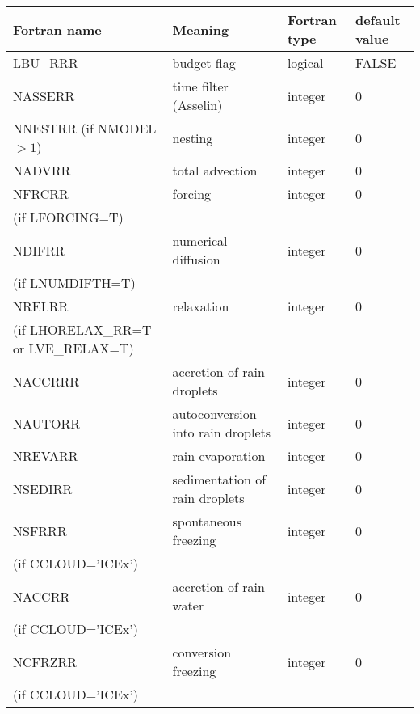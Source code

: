\begin{center}
\begin{tabular} {|p{8cm}|p{4cm}|>{\centering}p{1.5cm}|p{1.5cm}<{\centering}|}
\hline
Fortran name & Meaning & Fortran type & default value \\
\hline \hline
LBU\_RRR & budget flag & logical & FALSE\index{LBU\_RRR!\innam{NAM\_BU\_RRR}} \\\hline
NASSERR  & time filter (Asselin)   & integer  &  0 \index{NASSERR!\innam{NAM\_BU\_RRR}} \\\hline
NNESTRR (if NMODEL$>1$) & nesting           & integer  &  0 \index{NNESTRR!\innam{NAM\_BU\_RRR}} \\\hline
NADVRR   & total advection   & integer  &  0 \index{NADVRR!\innam{NAM\_BU\_RRR}}\\\hline
NFRCRR   & forcing           & integer  &  0 \index{NFRCRR!\innam{NAM\_BU\_RRR}} \\
(if LFORCING=T) &  &   &   \\\hline
NDIFRR   & numerical diffusion & integer  &  0 \index{NDIFRR!\innam{NAM\_BU\_RRR}}\\
(if LNUMDIFTH=T) &  &   &   \\\hline
NRELRR   & relaxation        & integer  &  0 \index{NRELRR!\innam{NAM\_BU\_RRR}}\\
(if LHORELAX\_RR=T or LVE\_RELAX=T) &  &   &   \\\hline
NACCRRR  & accretion of rain droplets & integer  &  0 \index{NACCRRR!\innam{NAM\_BU\_RRR}}\\\hline
NAUTORR   & autoconversion into rain droplets& integer  &  0 \index{NAUTORR!\innam{NAM\_BU\_RRR}}\\\hline
NREVARR   & rain evaporation  & integer  &  0 \index{NREVARR!\innam{NAM\_BU\_RRR}}\\\hline
NSEDIRR   & sedimentation of rain droplets& integer  &  0 \index{NSEDIRR!\innam{NAM\_BU\_RRR}}\\\hline
NSFRRR   & spontaneous freezing & integer  &  0 \index{NSFRRR!\innam{NAM\_BU\_RRR}}\\
(if CCLOUD='ICEx') & &   &  \\\hline
NACCRR   & accretion of rain water & integer  &  0 \index{NACCRR!\innam{NAM\_BU\_RRR}}\\
(if CCLOUD='ICEx') & &   &  \\\hline
NCFRZRR  & conversion freezing & integer  &  0 \index{NCFRZRR!\innam{NAM\_BU\_RRR}}\\
(if CCLOUD='ICEx') & &   &  \\\hline

\end{tabular}
\end{center}
